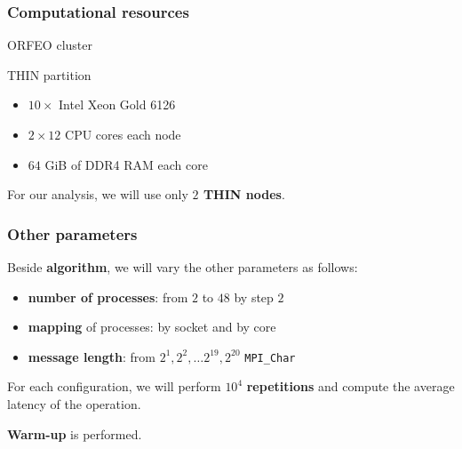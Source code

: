 \documentclass{beamer}
\begin{document}
\begin{frame}
\frametitle{Computational resources}

ORFEO cluster

THIN partition

\begin{itemize}
    \item $10 \times$ Intel Xeon Gold 6126
    \item $2 \times 12$ CPU cores each node
    \item $64$ GiB of DDR4 RAM each core
\end{itemize}

For our analysis, we will use only \textbf{$2$ THIN nodes}.
\end{frame}


\begin{frame}
\frametitle{Other parameters}
Beside \textbf{algorithm}, we will vary the other parameters as follows:
\begin{itemize}
    \item \textbf{number of processes}: from $2$ to $48$ by step $2$
    \item \textbf{mapping} of processes: by socket and by core
    \item \textbf{message length}: from $2^1, 2^2, \dots 2^{19}, 2^{20}$ \texttt{MPI\_Char}
\end{itemize}

For each configuration, we will perform $10^4$ \textbf{repetitions} and compute the average latency of the operation.

\textbf{Warm-up} is performed.

\end{frame}
\end{document}
